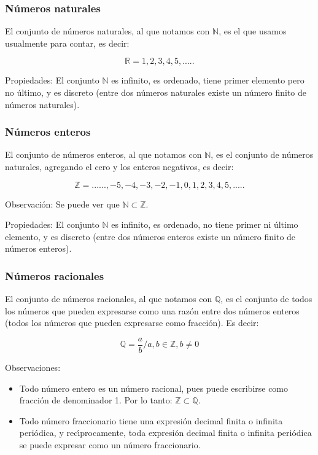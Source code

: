 \documentclass{article}
\begin{document}
\subsubsection{N\'umeros naturales}

El conjunto de n\'umeros naturales, al que notamos con $\mathbb{N}$, es el que usamos usualmente para contar, es decir:

\begin{equation}
\mathbb{R} = {1, 2, 3, 4, 5, .....}
\end{equation}

Propiedades: El conjunto $\mathbb{N}$ es infinito, es ordenado, tiene primer elemento pero no \'ultimo, y es discreto (entre dos n\'umeros naturales existe un n\'umero finito de n\'umeros naturales).

\subsubsection{N\'umeros enteros}
El conjunto de n\'umeros enteros, al que notamos con $\mathbb{N}$, es el conjunto de n\'umeros naturales, agregando el cero y los enteros negativos, es decir:

\begin{equation}
\mathbb{Z} = {......, −5, −4, −3, −2, −1, 0, 1, 2, 3, 4, 5, .....}
\end{equation}

Observaci\'on: Se puede ver que $\mathbb{N} \subset \mathbb{Z}$.

Propiedades: El conjunto $\mathbb{N}$ es infinito, es ordenado, no tiene primer ni \'ultimo elemento, y es discreto (entre dos n\'umeros enteros existe un n\'umero finito de n\'umeros enteros).

\subsubsection{N\'umeros racionales}
El conjunto de n\'umeros racionales, al que notamos con $\mathbb{Q}$, es el conjunto de todos los n\'umeros que pueden expresarse como una raz\'on entre dos n\'umeros enteros (todos los n\'umeros que pueden expresarse como fracci\'on). Es decir:

\begin{equation}
\mathbb{Q} = {\frac{a}{b} / a, b \in \mathbb{Z}, b \neq 0}
\end{equation}

Observaciones:
\begin{itemize}
  \item Todo n\'umero entero es un n\'umero racional, pues puede escribirse como fracci\'on de denominador 1. Por lo tanto: $\mathbb{Z} \subset \mathbb{Q}$.
  \item Todo n\'umero fraccionario tiene una expresi\'on decimal finita o infinita peri\'odica, y rec\'ıprocamente, toda expresi\'on decimal finita o infinita peri\'odica se puede expresar como un n\'umero fraccionario.
\end{itemize}
\end{document}
